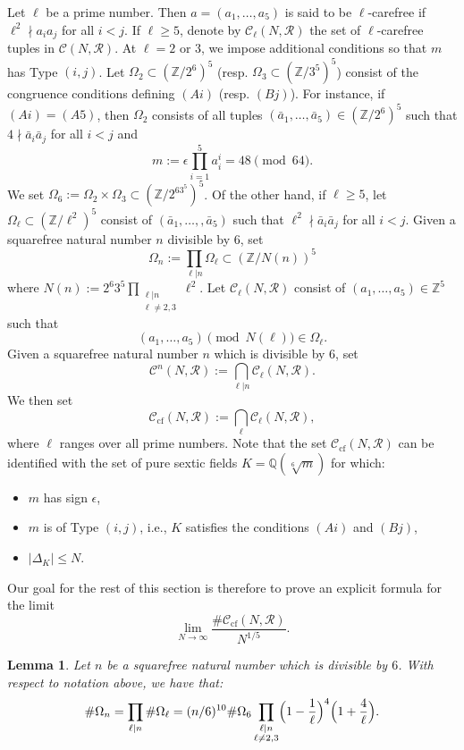 \documentclass[table]{amsart}
\newtheorem{lemma}[theorem]{Lemma}
\newcommand{\Z}{\mathbb{Z}}
\newcommand{\Q}{\mathbb{Q}}
\newcommand{\op}[1]{\operatorname{#1}}
\numberwithin{equation}{section}
\begin{document}
\par Let $\ell$ be a prime number. Then $a=(a_1, \dots, a_5)$ is said to be $\ell$-carefree if $\ell^2\nmid a_i a_j$ for all $i<j$. If $\ell\geq 5$, denote by $\mathcal{C}_\ell(N,\mathscr{R})$ the set of $\ell$-carefree tuples in $\mathcal{C}(N,\mathscr{R})$. At $\ell=2$ or $3$, we impose additional conditions so that $m$ has Type $(i,j)$. Let $\Omega_2\subset \left(\Z/2^{6}\right)^5$ (resp. $\Omega_3\subset \left(\Z/3^{5}\right)^5$) consist of the congruence conditions defining $(Ai)$ (resp. $(Bj)$). For instance, if $(Ai)=(A5)$, then $\Omega_2$ consists of all tuples $(\bar{a}_1, \dots, \bar{a}_5)\in \left(\Z/2^6\right)^5$ such that $4\nmid \bar{a}_i\bar{a}_j$ for all $i<j$ and \[m:=\epsilon \prod_{i=1}^5 a_i^i=48\pmod{64}.\] We set $\Omega_6:=\Omega_2\times \Omega_3\subset \left(\Z/2^63^5\right)^5$. Of the other hand, if $\ell\geq 5$, let $\Omega_\ell\subset \left(\Z/\ell^2\right)^5$ consist of $(\bar{a}_1,\dots, , \bar{a}_5)$ such that $\ell^2\nmid \bar{a}_i\bar{a}_j$ for all $i<j$. Given a squarefree natural number $n$ divisible by $6$, set
\[\Omega_n:=\prod_{\ell|n}\Omega_\ell\subset \left(\Z/N(n)\right)^5\] where $N(n):=2^{6}3^{5}\prod_{\substack{\ell|n\\
\ell\neq 2,3}} \ell^2$. Let $\mathcal{C}_\ell(N,\mathscr{R})$ consist of $(a_1, \dots, a_5)\in \Z^5$ such that 
\[(a_1, \dots, a_5)\pmod{N(\ell)}\in \Omega_\ell.\] Given a squarefree natural number $n$ which is divisible by $6$, set
\[\mathcal{C}^n(N,\mathscr{R}):=\bigcap_{\ell|n} \mathcal{C}_\ell(N,\mathscr{R}).\] We then set 
\[\mathcal{C}_{\op{cf}}(N,\mathscr{R}):=\bigcap_\ell \mathcal{C}_\ell(N,\mathscr{R}),\]where $\ell$ ranges over all prime numbers. Note that the set $\mathcal{C}_{\op{cf}}(N,\mathscr{R})$ can be identified with the set of pure sextic fields $K=\Q(\sqrt[6]{m})$ for which:
\begin{itemize}
    \item $m$ has sign $\epsilon$, 
    \item $m$ is of Type $(i,j)$, i.e., $K$ satisfies the conditions $(Ai)$ and $(Bj)$,
    \item $|\Delta_K|\leq N$.
\end{itemize}
Our goal for the rest of this section is therefore to prove an explicit formula for the limit
\[\lim_{N\rightarrow \infty} \frac{\#\mathcal{C}_{\op{cf}}(N, \mathscr{R})}{N^{1/5}}.\]
\begin{lemma}
  Let $n$ be a squarefree natural number which is divisible by $6$. With respect to notation above, we have that:\[
\#\Omega_n
=
\prod_{\ell\mid n} \#\Omega_\ell
=
(n/6)^{10}\#\Omega_6\prod_{\substack{\ell\mid n\\\ell\neq 2,3}}
\Bigl(1-\frac{1}{\ell}\Bigr)^4
\Bigl(1+\frac{4}{\ell}\Bigr).
\]
\end{lemma}
\end{document}
